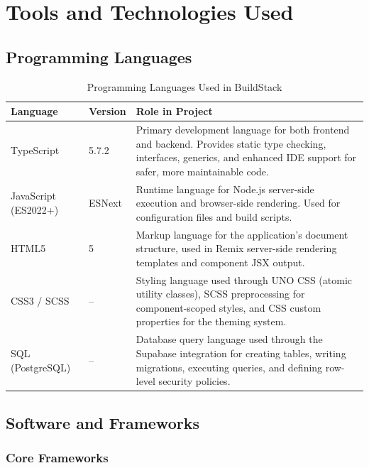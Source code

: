 \documentclass[12pt,a4paper,openany]{report}
\begin{document}
\chapter{Tools and Technologies Used}

\section{Programming Languages}

\begin{table}[H]
\centering
\caption{Programming Languages Used in BuildStack}
\label{tab:languages}
\begin{tabular}{|p{3cm}|p{2cm}|p{7cm}|}
\hline
\textbf{Language} & \textbf{Version} & \textbf{Role in Project} \\
\hline
TypeScript & 5.7.2 & Primary development language for both frontend and backend. Provides static type checking, interfaces, generics, and enhanced IDE support for safer, more maintainable code. \\
\hline
JavaScript (ES2022+) & ESNext & Runtime language for Node.js server-side execution and browser-side rendering. Used for configuration files and build scripts. \\
\hline
HTML5 & 5 & Markup language for the application's document structure, used in Remix server-side rendering templates and component JSX output. \\
\hline
CSS3 / SCSS & -- & Styling language used through UNO CSS (atomic utility classes), SCSS preprocessing for component-scoped styles, and CSS custom properties for the theming system. \\
\hline
SQL (PostgreSQL) & -- & Database query language used through the Supabase integration for creating tables, writing migrations, executing queries, and defining row-level security policies. \\
\hline
\end{tabular}
\end{table}

\section{Software and Frameworks}

\subsection{Core Frameworks}
\end{document}
